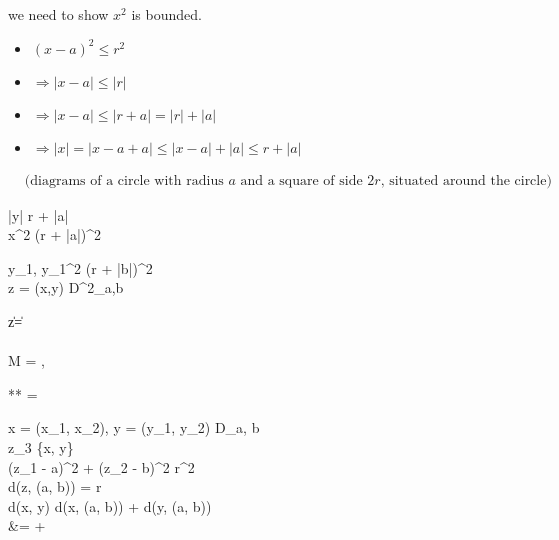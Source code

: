 \documentclass{article}
\theoremstyle{definition}
\numberwithin{equation}{section}
\begin{document}
\noindent{}

\noindent we need to show $x^2$ is bounded.

\begin{itemize}
    \item $(x - a)^2 \leq r^2$
    \item $\Rightarrow |x - a| \leq |r|$
    \item $\Rightarrow |x - a| \leq |r + a| = |r| + |a|$
    \item $\Rightarrow |x| = |x - a + a| \leq |x - a| + |a| \leq r + |a|$
\end{itemize}

\begin{align*}
    &\text{(diagrams of a circle with radius } a \text{ and a square of side } 2r\text{, situated around the circle)}
\end{align*}

\Rightarrow |y| \leq r + |a| \\
\Rightarrow x^2 \leq (r + |a|)^2

 y_1, \quad y_1^2 \leq (r + |b|)^2 \\

\forall z = (x,y) \in D^2_{a,b}

\|z\| =  \\

\leq {} \\

 M = , 

**  = 

 x = (x_1, x_2), \quad y = (y_1, y_2) \in D_{a, b} \\

z_3 \in \{x, y\} \\

(z_1 - a)^2 + (z_2 - b)^2 \leq r^2 \\

\Rightarrow d(z, (a, b)) =  \leq r \\

\Rightarrow d(x, y) \leq d(x, (a, b)) + d(y, (a, b)) \\

&=  +  \\
\end{document}
